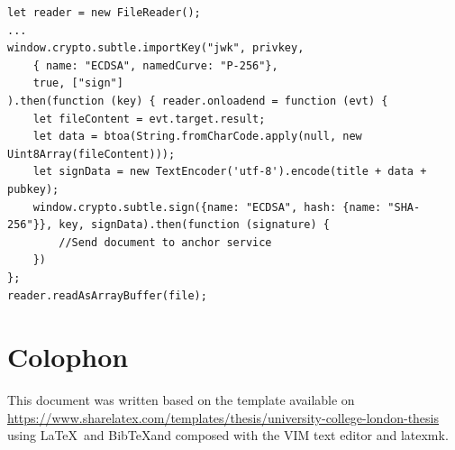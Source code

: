 \documentclass[12pt,msc,a4paper,oneside]{ucl_thesis}
\begin{document}
\begin{Code}
\begin{lstlisting}[style=myJavascript, caption=Document generation and signing in JavaScript, label=lst:document_signature]
let reader = new FileReader();
...
window.crypto.subtle.importKey("jwk", privkey,
    { name: "ECDSA", namedCurve: "P-256"},
    true, ["sign"]
).then(function (key) { reader.onloadend = function (evt) {
    let fileContent = evt.target.result;
    let data = btoa(String.fromCharCode.apply(null, new Uint8Array(fileContent)));
    let signData = new TextEncoder('utf-8').encode(title + data + pubkey);
    window.crypto.subtle.sign({name: "ECDSA", hash: {name: "SHA-256"}}, key, signData).then(function (signature) {
        //Send document to anchor service
    })
};
reader.readAsArrayBuffer(file);
\end{lstlisting}
\end{Code}

\chapter{Colophon} \label{appendixlabel3}
This document was written based on the template available on \url{https://www.sharelatex.com/templates/thesis/university-college-london-thesis} using \LaTeX\ and Bib\TeX  and composed with the VIM text editor and latexmk. 




\end{document}
